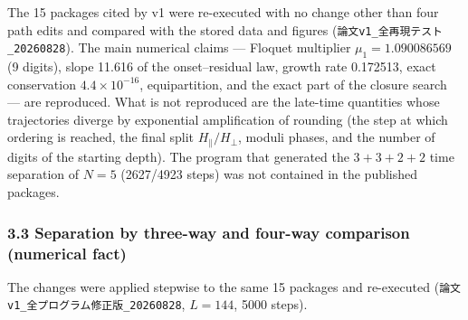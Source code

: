 \documentclass[
  10pt,
  a4paper,
]{article}
\begin{document}
The 15 packages cited by v1 were re-executed with no change other than
four path edits and compared with the stored data and figures
(\texttt{論文v1\_全再現テスト\_20260828}). The main numerical claims ---
Floquet multiplier \(\mu_1=1.090086569\) (9 digits), slope 11.616 of the
onset--residual law, growth rate 0.172513, exact conservation
\(4.4\times10^{-16}\), equipartition, and the exact part of the closure
search --- are reproduced. What is not reproduced are the late-time
quantities whose trajectories diverge by exponential amplification of
rounding (the step at which ordering is reached, the final split
\(H_\parallel/H_\perp\), moduli phases, and the number of digits of the
starting depth). The program that generated the \(3+3+2+2\) time
separation of \(N=5\) (2627/4923 steps) was not contained in the
published packages.

\subsubsection{3.3 Separation by three-way and four-way comparison
(numerical
fact)}\label{separation-by-three-way-and-four-way-comparison-numerical-fact}

The changes were applied stepwise to the same 15 packages and
re-executed (\texttt{論文v1\_全プログラム修正版\_20260828}, \(L=144\),
5000 steps).
\end{document}
